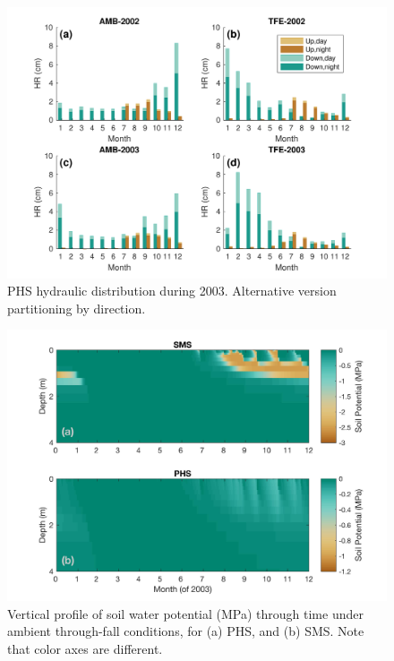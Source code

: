 \documentclass[draft,linenumbers]{agujournal}
\begin{document}
  
      \begin{figure}[h]
     \centering
     \includegraphics[width=30pc]{../figs3/hr2}
     \caption{PHS hydraulic distribution during 2003. Alternative version partitioning by direction.}
     \label{supp:hr}
  \end{figure}
  \clearpage
  



  
  
        \clearpage
    \begin{figure}[h]
     \centering
     \includegraphics[width=30pc]{../figs3/suppsmp.jpg}
     \caption{Vertical profile of soil water potential (MPa) through time under ambient through-fall conditions, for
     (a) PHS, and 
     (b) SMS.
     Note that color axes are different. }
     \label{supp:sm}
  \end{figure}
  
\end{document}
